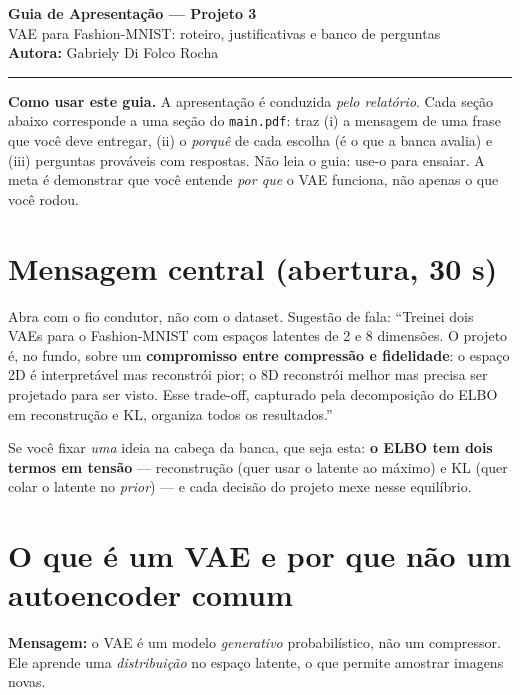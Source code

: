 \documentclass[11pt,a4paper]{article}
\begin{document}
\begin{center}
{\LARGE \textbf{Guia de Apresentação --- Projeto 3}}\\[0.3em]
{\large VAE para Fashion-MNIST: roteiro, justificativas e banco de perguntas}\\[0.2em]
\textbf{Autora:} Gabriely Di Folco Rocha
\end{center}
\vspace{-0.4em}\hrule\vspace{0.8em}

\begin{dica}
\textbf{Como usar este guia.} A apresentação é conduzida \emph{pelo relatório}.
Cada seção abaixo corresponde a uma seção do \texttt{main.pdf}: traz (i) a
mensagem de uma frase que você deve entregar, (ii) o \emph{porquê} de cada
escolha (é o que a banca avalia) e (iii) perguntas prováveis com respostas.
Não leia o guia: use-o para ensaiar. A meta é demonstrar que você entende
\emph{por que} o VAE funciona, não apenas o que você rodou.
\end{dica}

\section{Mensagem central (abertura, 30 s)}

\begin{dica}
Abra com o fio condutor, não com o dataset. Sugestão de fala:
``Treinei dois VAEs para o Fashion-MNIST com espaços latentes de 2 e 8
dimensões. O projeto é, no fundo, sobre um \textbf{compromisso entre compressão
e fidelidade}: o espaço 2D é interpretável mas reconstrói pior; o 8D reconstrói
melhor mas precisa ser projetado para ser visto. Esse trade-off, capturado pela
decomposição do ELBO em reconstrução e KL, organiza todos os resultados.''
\end{dica}

Se você fixar \emph{uma} ideia na cabeça da banca, que seja esta: \textbf{o ELBO
tem dois termos em tensão} --- reconstrução (quer usar o latente ao máximo) e KL
(quer colar o latente no \textit{prior}) --- e cada decisão do projeto mexe
nesse equilíbrio.

\section{O que é um VAE e por que não um autoencoder comum}

\textbf{Mensagem:} o VAE é um modelo \emph{generativo} probabilístico, não um
compressor. Ele aprende uma \emph{distribuição} no espaço latente, o que permite
amostrar imagens novas.
\end{document}
